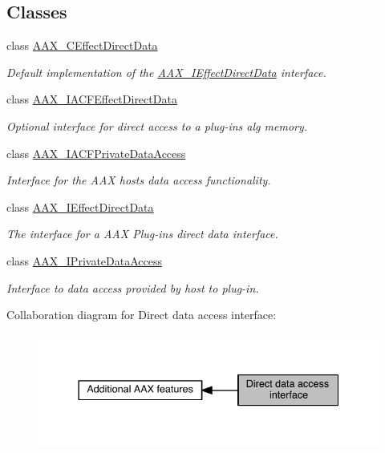 \subsection*{Classes}
\begin{DoxyCompactItemize}
\item 
class \hyperlink{a00016}{A\+A\+X\+\_\+\+C\+Effect\+Direct\+Data}
\begin{DoxyCompactList}\small\item\em Default implementation of the \hyperlink{a00097}{A\+A\+X\+\_\+\+I\+Effect\+Direct\+Data} interface. \end{DoxyCompactList}\item 
class \hyperlink{a00059}{A\+A\+X\+\_\+\+I\+A\+C\+F\+Effect\+Direct\+Data}
\begin{DoxyCompactList}\small\item\em Optional interface for direct access to a plug-\/in\textquotesingle{}s alg memory. \end{DoxyCompactList}\item 
class \hyperlink{a00078}{A\+A\+X\+\_\+\+I\+A\+C\+F\+Private\+Data\+Access}
\begin{DoxyCompactList}\small\item\em Interface for the A\+A\+X host\textquotesingle{}s data access functionality. \end{DoxyCompactList}\item 
class \hyperlink{a00097}{A\+A\+X\+\_\+\+I\+Effect\+Direct\+Data}
\begin{DoxyCompactList}\small\item\em The interface for a A\+A\+X Plug-\/in\textquotesingle{}s direct data interface. \end{DoxyCompactList}\item 
class \hyperlink{a00111}{A\+A\+X\+\_\+\+I\+Private\+Data\+Access}
\begin{DoxyCompactList}\small\item\em Interface to data access provided by host to plug-\/in. \end{DoxyCompactList}\end{DoxyCompactItemize}
Collaboration diagram for Direct data access interface\+:
\nopagebreak
\begin{figure}[H]
\begin{center}
\leavevmode
\includegraphics[width=337pt]{a00333}
\end{center}
\end{figure}
